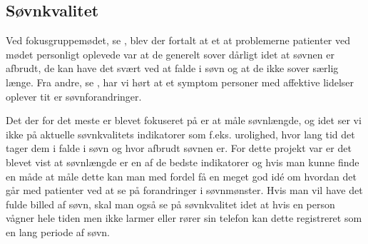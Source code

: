 \subsection{Søvnkvalitet}
Ved fokusgruppemødet, se \citep[Kapitel 1, Afsnit 5]{misc:faellesrapp}, blev der fortalt at et at problemerne patienter ved mødet personligt oplevede var at de generelt sover dårligt idet at søvnen er afbrudt, de kan have det svært ved at falde i søvn og at de ikke sover særlig længe.
Fra andre, se \citep[Kapitel 1, Afsnit 3 og 4]{misc:faellesrapp}, har vi hørt at et symptom personer med affektive lidelser oplever tit er søvnforandringer. 

Det der for det meste er blevet fokuseret på er at måle søvnlængde, og idet ser vi ikke på aktuelle søvnkvalitets indikatorer som f.eks. urolighed, hvor lang tid det tager dem i falde i søvn og hvor afbrudt søvnen er.
For dette projekt var er det blevet vist at søvnlængde er en af de bedste indikatorer og hvis man kunne finde en måde at måle dette kan man med fordel få en meget god idé om hvordan det går med patienter ved at se på forandringer i søvnmønster. 
Hvis man vil have det fulde billed af søvn, skal man også se på søvnkvalitet idet at hvis en person vågner hele tiden men ikke larmer eller rører sin telefon kan dette registreret som en lang periode af søvn.